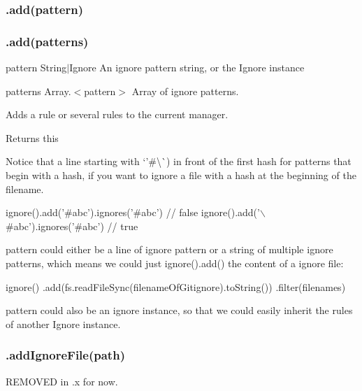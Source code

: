 \subsubsection*{.add(pattern)}

\subsubsection*{.add(patterns)}


\begin{DoxyItemize}
\item pattern {\ttfamily String$\vert$\+Ignore} An ignore pattern string, or the {\ttfamily Ignore} instance
\item patterns {\ttfamily Array.$<$pattern$>$} Array of ignore patterns.
\end{DoxyItemize}

Adds a rule or several rules to the current manager.

Returns {\ttfamily this}

Notice that a line starting with `'\#\textquotesingle{}\textbackslash{}\textquotesingle{}\`{}) in front of the first hash for patterns that begin with a hash, if you want to ignore a file with a hash at the beginning of the filename.


\begin{DoxyCode}
ignore().add('#abc').ignores('#abc')    // false
ignore().add('\(\backslash\)#abc').ignores('#abc')   // true
\end{DoxyCode}


{\ttfamily pattern} could either be a line of ignore pattern or a string of multiple ignore patterns, which means we could just {\ttfamily ignore().add()} the content of a ignore file\+:


\begin{DoxyCode}
ignore()
.add(fs.readFileSync(filenameOfGitignore).toString())
.filter(filenames)
\end{DoxyCode}


{\ttfamily pattern} could also be an {\ttfamily ignore} instance, so that we could easily inherit the rules of another {\ttfamily Ignore} instance.

\subsubsection*{.add\+Ignore\+File(path)}

R\+E\+M\+O\+V\+ED in {.\+x} for now.

